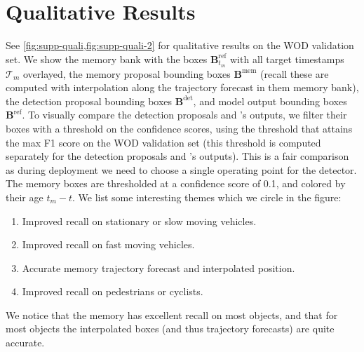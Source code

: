 \section{Qualitative Results}

See \cref{fig:supp-quali,fig:supp-quali-2} for qualitative results on the WOD validation set.
We show the memory bank with the boxes $\mathbf{B}^\mathrm{ref}_{t_m}$ with all target timestamps $\mathcal{T}_m$ overlayed,
the memory proposal bounding boxes $\mathbf{B}^\mathrm{mem}$ (recall these are computed with interpolation along the trajectory forecast in them memory bank),
the detection proposal bounding boxes $\mathbf{B}^\mathrm{det}$,
and model output bounding boxes $\mathbf{B}^\mathrm{ref}$.
To visually compare the detection proposals and \ourmodel{}'s outputs, we filter their boxes
with a threshold on the confidence scores, using the threshold that attains the max F1 score on the WOD validation set (this threshold is computed separately for the detection proposals and \ourmodel{}'s outputs).
This is a fair comparison as during deployment we need to choose a single operating point for the detector.
The memory boxes are thresholded at a confidence score of 0.1, and colored by their age $t_m - t$.
We list some interesting themes which we circle in the figure:
\begin{enumerate}[label=\alph*)]
    \item Improved recall on stationary or slow moving vehicles.
    \item Improved recall on fast moving vehicles.
    \item Accurate memory trajectory forecast and interpolated position.
    \item Improved recall on pedestrians or cyclists.
\end{enumerate}
We notice that the memory has excellent recall on most objects, and that
for most objects the interpolated boxes (and thus trajectory forecasts) are quite accurate.



